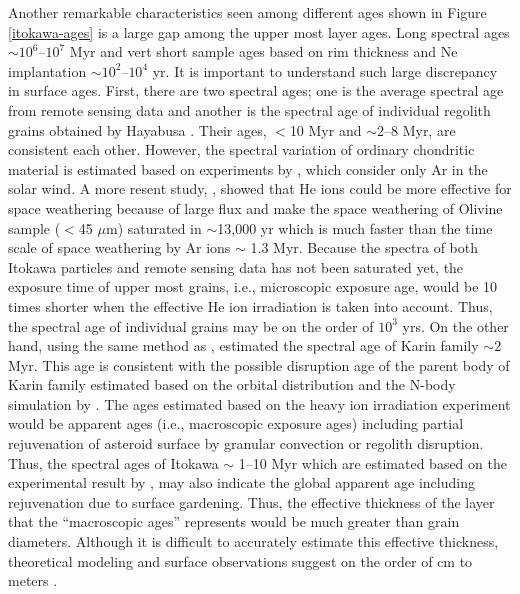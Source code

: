 \documentclass[3p,authoryear]{elsarticle}
\begin{document}
Another remarkable characteristics seen among different ages shown in Figure \ref{itokawa-ages} is a large gap among the upper most layer ages. Long spectral ages $\sim 10^6$--$10^7$ Myr and vert short sample ages based on rim thickness and Ne implantation $\sim 10^2$--$10^4$ yr. It is important to understand such large discrepancy in surface ages. First, there are two spectral ages; one is the average spectral age from remote sensing data \citep{koga2014} and another is the spectral age of individual regolith grains obtained by Hayabusa \citep{bonal2015}. Their ages, $<$10 Myr and $\sim$2--8 Myr, are consistent each other.
 However, the spectral variation of ordinary chondritic material is estimated based on experiments by \citet{strazzulla2005}, which consider only Ar in the solar wind. A more resent study, \citet{loeffler2009}, showed that He ions could be more effective for space weathering because of large flux and make the space weathering of Olivine sample ($<$45 $\mu$m) saturated in $\sim$13,000 yr which is much faster than the time scale of space weathering by Ar ions $\sim$ 1.3 Myr. Because the spectra of both Itokawa particles and remote sensing data has not been saturated yet, the exposure time of upper most grains, i.e., microscopic exposure age, would be 10 times shorter when the effective He ion irradiation is taken into account. Thus, the spectral age of individual grains may be on the order of $10^3$ yrs. On the other hand, using the same method as \citet{bonal2015}, \citet{brunetto2006b} estimated the spectral age of Karin family $\sim$2 Myr. This age is consistent with the possible disruption age of the parent body of Karin family estimated based on the orbital distribution and the N-body simulation by \citet{nesvorny2002}. The ages estimated based on the heavy ion irradiation experiment \citep{strazzulla2005} would be apparent ages (i.e., macroscopic exposure ages) including partial rejuvenation of asteroid surface by granular convection or regolith disruption. Thus, the spectral ages of Itokawa $\sim$ 1--10 Myr \citep{koga2014,bonal2015} which are estimated based on the experimental result by \citet{strazzulla2005}, may also indicate the global apparent age including rejuvenation due to surface gardening. Thus, the effective thickness of the layer that the ``macroscopic ages'' represents would be much greater than grain diameters. Although it is difficult to accurately estimate this effective thickness, theoretical modeling and surface observations suggest on the order of cm to meters \citep{tancredi2012, yamada2016}.
\end{document}
